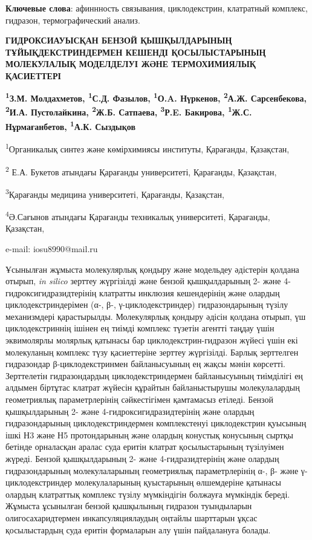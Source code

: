 {\bfseries Ключевые слова}: афиннность связывания, циклодекстрин,
клатратный комплекс, гидразон, термографический анализ.

\begin{articleheader}
{\bfseries ГИДРОКСИАУЫСҚАН БЕНЗОЙ ҚЫШҚЫЛДАРЫНЫҢ ТҰЙЫҚДЕКСТРИНДЕРМЕН КЕШЕНДІ ҚОСЫЛЫСТАРЫНЫҢ МОЛЕКУЛАЛЫҚ МОДЕЛДЕЛУІ ЖӘНЕ ТЕРМОХИМИЯЛЫҚ ҚАСИЕТТЕРІ}

{\bfseries
\textsuperscript{1}З.М. Молдахметов,
\textsuperscript{1}С.Д. Фазылов\textsuperscript{\envelope },
\textsuperscript{1}О.A. Нүркенов,
\textsuperscript{2}А.Ж. Сарсенбекова,
\textsuperscript{2}И.А. Пустолайкина,
\textsuperscript{2}Ж.Б. Сатпаева,
\textsuperscript{3}Р.E. Бакирова,
\textsuperscript{1}Ж.С. Нұрмағанбетов,
\textsuperscript{1}А.К. Сыздықов
}
\end{articleheader}

\begin{affiliation}
\textsuperscript{1}Органикалық синтез және көмірхимиясы институты, Қарағанды, Қазақстан,

\textsuperscript{2} Е.А. Букетов атындағы Қарағанды университеті, Қарағанды, Қазақстан,

\textsuperscript{3}Қарағанды медицина университеті, Қарағанды, Қазақстан,

\textsuperscript{4}Ә.Сағынов атындағы Қарағанды техникалық университеті, Қарағанды, Қазақстан,

e-mail: iosu8990@mail.ru
\end{affiliation}

Ұсынылған жұмыста молекулярлық қондыру және модельдеу әдістерін қолдана
отырып, \emph{in silico} зерттеу жүргізілді және бензой қышқылдарының 2-
және 4-гидроксигидразидтерінің клатратты инклюзия кешендерінің және
олардың циклодекстриндерімен (α-, β-, γ-циклодекстриндер)
гидразондарының түзілу механизмдері қарастырылды. Молекулярлық қондыру
әдісін қолдана отырып, үш циклодекстриннің ішінен ең тиімді комплекс
түзетін агентті таңдау үшін эквимолярлы молярлық қатынасы бар
циклодекстрин-гидразон жүйесі үшін екі молекуланың комплекс түзу
қасиеттеріне зерттеу жүргізілді. Барлық зерттелген гидразондар
β-циклодекстринмен байланысуының ең жақсы мәнін көрсетті. Зерттелетін
гидразондардың циклодекстриндермен байланысуының тиімділігі ең алдымен
біртұтас клатрат жүйесін құрайтын байланыстырушы молекулалардың
геометриялық параметрлерінің сәйкестігімен қамтамасыз етіледі. Бензой
қышқылдарының 2- және 4-гидроксигидразид\-терінің және олардың
гидразондарының циклодекстриндермен комплекстенуі циклодекстрин қуысының
ішкі Н3 және Н5 протондарының және олардың конустық конусының сыртқы
бетінде орналасқан аралас суда еритін клатрат қосылыстарының түзілуімен
жүреді. Бензой қышқылдарының 2- және 4-гидразидтерінің және олардың
гидразондарының молекулаларының геометриялық параметрлерінің α-, β- және
γ-циклодекстриндер молекулаларының қуыстарының өлшемдеріне қатынасы
олардың клатраттық комплекс түзілу мүмкіндігін болжауға мүмкіндік
береді. Жұмыста ұсынылған бензой қышқылының гидразон туындыларын
олигосахаридтермен инкапсуляциялаудың оңтайлы шарттарын ұқсас
қосылыстардың суда еритін формаларын алу үшін пайдалануға болады.

